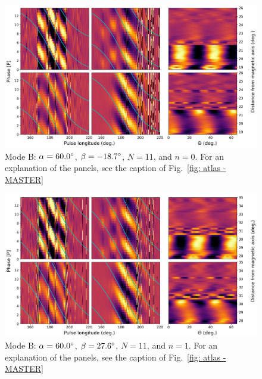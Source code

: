 \begin{figure}
	\begin{center}
		\includegraphics[width=\atlasHeightFrac\textwidth]{Figures/B0031/atlas/B_517060011000_plots}
		\caption[Atlas results: Mode B -- $\alpha=60.0\degr$, $\beta=-18.7\degr$, $N=11$, $n=0$]{Mode B: $\alpha=60.0\degr$, $\beta=-18.7\degr$, $N=11$, and $n=0$. For an explanation of the panels, see the caption of Fig.~\ref{fig: atlas - MASTER} }
		\label{fig: atlas - B_517060011000}
	\end{center}
\end{figure}

\begin{figure}
	\begin{center}
		\includegraphics[width=\atlasHeightFrac\textwidth]{Figures/B0031/atlas/B_517060011001_plots}
		\caption[Atlas results: Mode B -- $\alpha=60.0\degr$, $\beta=27.6\degr$, $N=11$, $n=1$]{Mode B: $\alpha=60.0\degr$, $\beta=27.6\degr$, $N=11$, and $n=1$. For an explanation of the panels, see the caption of Fig.~\ref{fig: atlas - MASTER} }
		\label{fig: atlas - B_517060011001}
	\end{center}
\end{figure}

